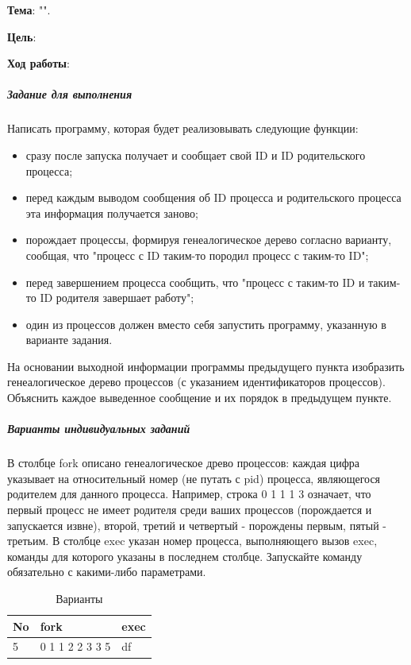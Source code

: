 \begin{center}
    \textbf{\titlePageTypeWork}
\end{center}

\textbf{Тема}: "\titlePageTopic".

\textbf{Цель}: 

\begin{center}
    \textbf{Ход работы}:
\end{center}

\subparagraph{Задание для выполнения}
Написать программу, которая будет реализовывать следующие функции:
\begin{itemize}
\item сразу после запуска получает и сообщает свой ID и ID родительского процесса;
\item перед каждым выводом сообщения об ID процесса и родительского процесса эта информация получается заново;
\item порождает процессы, формируя генеалогическое дерево согласно варианту, сообщая, что "процесс с ID таким-то породил процесс с таким-то ID";
\item перед завершением процесса сообщить, что "процесс с таким-то ID и таким-то ID родителя завершает работу";
\item один из процессов должен вместо себя запустить программу, указанную в варианте задания.
\end{itemize}

На основании выходной информации программы предыдущего пункта изобразить генеалогическое дерево процессов (с указанием идентификаторов процессов).
Объяснить каждое выведенное сообщение и их порядок в предыдущем пункте.

\subparagraph{Варианты индивидуальных заданий}
В столбце fork описано генеалогическое древо процессов: каждая цифра указывает на относительный номер (не путать с pid) процесса, являющегося родителем для данного процесса. 
Например, строка 0 1 1 1 3 означает, что первый процесс не имеет родителя среди ваших процессов (порождается и запускается извне), второй, третий и четвертый - порождены первым, пятый - третьим.
В столбце exec указан номер процесса, выполняющего вызов exec, команды для которого указаны в последнем столбце.
Запускайте команду обязательно с какими-либо параметрами.

\begin{table}[!htp]
    \centering
    \caption{Варианты}
    \begin{tabular}{|l|l|l|}
        \hline
        No  & fork              & exec  \\  \hline
        \hline
        5   & 0 1 1 2 2 3 3 5   & df    \\  \hline
    \end{tabular}
\end{table}


